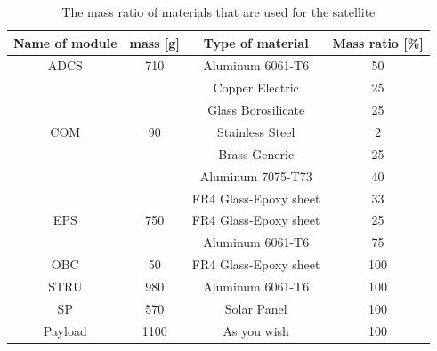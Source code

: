 \documentclass[12pt, a4paper,titlepage]{article}
\numberwithin{equation}{section}
\numberwithin{figure}{section}
\begin{document}
\begin{table}
\begin{center}
\begin{tabular}{ |c|c|c|c|} 
 \hline
 Name of module & mass [g] & Type of material & Mass ratio [\%]\\\hline
 ADCS &	710	& Aluminum 6061-T6 &	50\\
			& & Copper Electric	& 25 \\
			& &  Glass Borosilicate 	& 25\\\hline
COM	& 	90	& 	Stainless Steel 	& 2\\
			& 	& Brass Generic		& 25\\
			& 	& Aluminum 7075-T73		& 40\\
			& 	& FR4 Glass-Epoxy sheet	& 	33\\\hline
EPS	& 	750	& 	FR4 Glass-Epoxy sheet		& 25\\
			& 	& Aluminum 6061-T6		& 75\\\hline
OBC	&	50		& FR4 Glass-Epoxy sheet	& 	100\\\hline
STRU	& 	980		& Aluminum 6061-T6	& 	100\\\hline
SP	& 	570		& Solar Panel	& 	100\\\hline
Payload	& 	1100	& 	As you wish	& 	100\\
 \hline
\end{tabular}
\end{center}
\caption{The mass ratio of materials that are used for the satellite}
\end{table}
\end{document}
